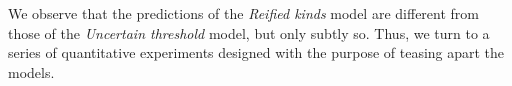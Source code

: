 \documentclass[floatsintext,doc]{apa6}
\newcommand{\ndg}[1]{{\textcolor{Green}{[ndg: #1]}}}
\begin{document}
We observe that the predictions of the \emph{Reified kinds} model are different from those of the \emph{Uncertain threshold} model, but only subtly so.
Thus, we turn to a series of quantitative experiments designed with the purpose of teasing apart the models. 

%
%
%
\end{document}
